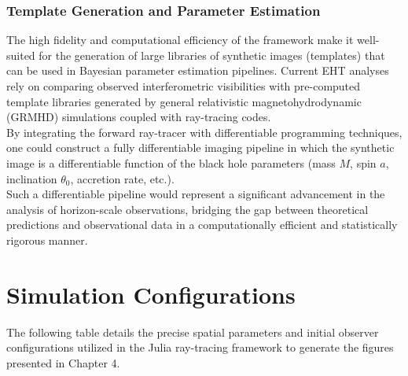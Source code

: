 \documentclass[11pt]{book}
\begin{document}
\subsection{Template Generation and Parameter Estimation}

The high fidelity and computational efficiency of the framework make it well-suited for the generation of large libraries of synthetic images (templates) that can be used in Bayesian parameter estimation pipelines. Current EHT analyses rely on comparing observed interferometric visibilities with pre-computed template libraries generated by general relativistic magnetohydrodynamic (GRMHD) simulations coupled with ray-tracing codes.\\
By integrating the forward ray-tracer with differentiable programming techniques, one could construct a fully differentiable imaging pipeline in which the synthetic image is a differentiable function of the black hole parameters (mass $M$, spin $a$, inclination $\theta_0$, accretion rate, etc.).\\
Such a differentiable pipeline would represent a significant advancement in the analysis of horizon-scale observations, bridging the gap between theoretical predictions and observational data in a computationally efficient and statistically rigorous manner.
\newpage

\let\cleardoublepage\clearpage

\appendix
\chapter{Simulation Configurations}
\label{app:sim_parameters}

The following table details the precise spatial parameters and initial observer configurations utilized in the Julia ray-tracing framework to generate the figures presented in Chapter 4. 
\end{document}
